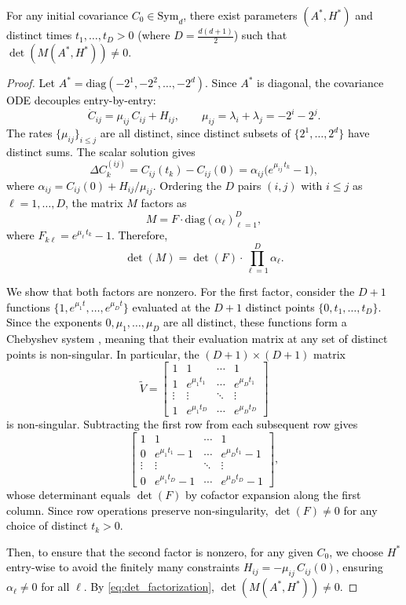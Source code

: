 \documentclass[twoside,11pt]{article}
\newcommand{\rv}[1]{\textcolor{black}{#1}}
\begin{document}
\rv{\begin{prop}
\label{prop:exhibit}
For any initial covariance $C_0 \in \mathrm{Sym}_d$, there exist parameters 
$(A^*, H^*)$ and distinct times $t_1, \ldots, t_D > 0$ 
(where $D = \frac{d(d+1)}{2}$) such that $\det(M(A^*, H^*)) \neq 0$.
\end{prop}}
\begin{proof}
\rv{Let $A^* = \mathrm{diag}(-2^1, -2^2, \ldots, -2^d)$. Since $A^*$ is diagonal, 
the covariance ODE decouples entry-by-entry:
\[
\dot{C}_{ij} = \mu_{ij}\, C_{ij} + H_{ij}, 
\qquad \mu_{ij} = \lambda_i + \lambda_j = -2^i - 2^j.
\]
The rates $\{\mu_{ij}\}_{i \leq j}$ are all distinct, since distinct subsets 
of $\{2^1, \ldots, 2^d\}$ have distinct sums. The scalar solution gives
\[
\Delta C_k^{(ij)} 
= C_{ij}(t_k) - C_{ij}(0) 
= \alpha_{ij}\bigl(e^{\mu_{ij}\, t_k} - 1\bigr),
\]
where $\alpha_{ij} = C_{ij}(0) + H_{ij}/\mu_{ij}$. Ordering the $D$ pairs 
$(i,j)$ with $i \leq j$ as $\ell = 1, \ldots, D$, the matrix $M$ factors as
\[
M = F \cdot \mathrm{diag}(\alpha_\ell)_{\ell=1}^D,
\]
where $F_{k\ell} = e^{\mu_\ell\, t_k} - 1$. Therefore,
\begin{equation}
\label{eq:det_factorization}
\det(M) = \det(F) \cdot \prod_{\ell=1}^{D} \alpha_\ell.
\end{equation}}

\rv{We show that both factors are nonzero. For the first factor, consider the $D+1$ functions $\{1, e^{\mu_1 t}, \ldots, e^{\mu_D t}\}$ 
evaluated at the $D+1$ distinct points $\{0, t_1, \ldots, t_D\}$.  
Since the exponents $0, \mu_1, \ldots, \mu_D$ are all distinct, 
these functions form a Chebyshev system 
\citep[Ch.~1]{karlin1966tchebycheff}, meaning that their evaluation 
matrix at any set of distinct points is non-singular. In particular, 
the $(D{+}1) \times (D{+}1)$ matrix
\[
\widetilde{V} = \begin{bmatrix}
1 & 1 & \cdots & 1 \\
1 & e^{\mu_1 t_1} & \cdots & e^{\mu_D t_1} \\
\vdots & \vdots & \ddots & \vdots \\
1 & e^{\mu_1 t_D} & \cdots & e^{\mu_D t_D}
\end{bmatrix}
\]
is non-singular. Subtracting the first row from each subsequent row gives
\[
\begin{bmatrix}
1 & 1 & \cdots & 1 \\
0 & e^{\mu_1 t_1}-1 & \cdots & e^{\mu_D t_1}-1 \\
\vdots & \vdots & \ddots & \vdots \\
0 & e^{\mu_1 t_D}-1 & \cdots & e^{\mu_D t_D}-1
\end{bmatrix},
\]
whose determinant equals $\det(F)$ by cofactor expansion along the first 
column. Since row operations preserve non-singularity, $\det(F) \neq 0$ 
for any choice of distinct $t_k > 0$.}

\rv{Then, to ensure that the second factor is nonzero, for any given $C_0$, we choose $H^*$ entry-wise to avoid the finitely many 
constraints $H_{ij} = -\mu_{ij}\, C_{ij}(0)$, ensuring 
$\alpha_\ell \neq 0$ for all $\ell$. By \eqref{eq:det_factorization}, $\det(M(A^*, H^*)) \neq 0$.}
\end{proof}
\end{document}
